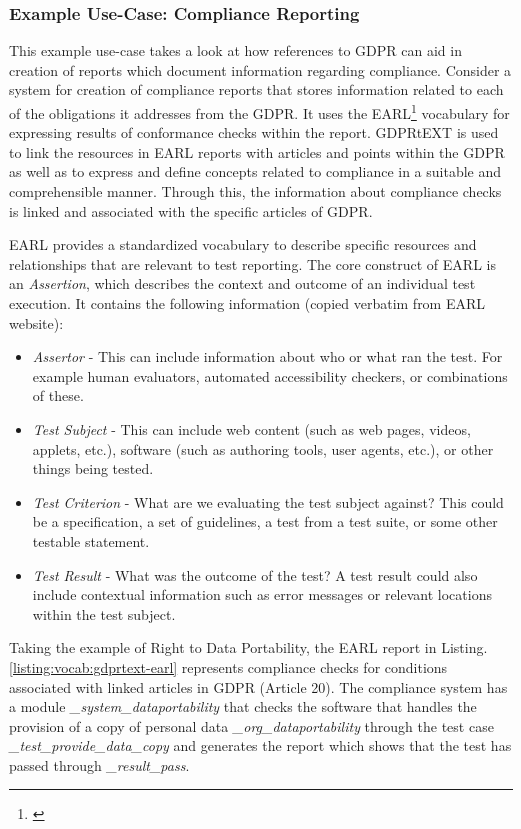 \subsubsection{Example Use-Case: Compliance Reporting}
This example use-case takes a look at how references to GDPR can aid in creation of reports which document information regarding compliance. Consider a system for creation of compliance reports that stores information related to each of the obligations it addresses from the GDPR. It uses the EARL\footnote{\url{}} vocabulary for expressing results of conformance checks within the report. GDPRtEXT is used to link the resources in EARL reports with articles and points within the GDPR as well as to express and define concepts related to compliance in a suitable and comprehensible manner. Through this, the information about compliance checks is linked and associated with the specific articles of GDPR.

EARL provides a standardized vocabulary to describe specific resources and relationships that are relevant to test reporting. The core construct of EARL is an \textit{Assertion}, which describes the context and outcome of an individual test execution. It contains the following information (copied verbatim from EARL website):

\begin{itemize}
    \item \textit{Assertor} - This can include information about who or what ran the test. For example human evaluators, automated accessibility checkers, or combinations of these.
    \item \textit{Test Subject} - This can include web content (such as web pages, videos, applets, etc.), software (such as authoring tools, user agents, etc.), or other things being tested.
    \item \textit{Test Criterion} - What are we evaluating the test subject against? This could be a specification, a set of guidelines, a test from a test suite, or some other testable statement.
    \item \textit{Test Result} - What was the outcome of the test? A test result could also include contextual information such as error messages or relevant locations within the test subject.
\end{itemize}

Taking the example of Right to Data Portability, the EARL report in Listing.\ref{listing:vocab:gdprtext-earl} represents compliance checks for conditions associated with linked articles in GDPR (Article 20). The compliance system has a module \textit{\_system\_dataportability} that checks the software that handles the provision of a copy of personal data \textit{\_org\_dataportability} through the test case \textit{\_test\_provide\_data\_copy} and generates the report which shows that the test has passed through \textit{\_result\_pass}.


